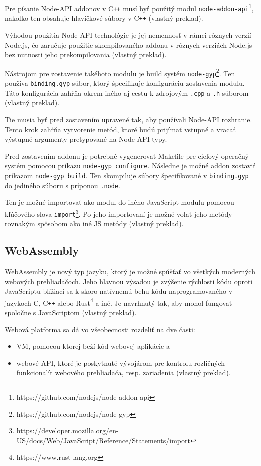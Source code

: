 Pre písanie Node-API addonov v C\texttt{++} musí byť použitý modul \texttt{node-addon-api}\footnote{https://github.com/nodejs/node-addon-api}, nakoľko ten obsahuje hlavičkové súbory v C\texttt{++} \cite{cpp_addons} (vlastný preklad).

Výhodou použitia Node-API technológie je jej nemennosť v rámci rôznych verzií Node.js, čo zaručuje použitie skompilovaného addonu v rôznych verziách Node.js bez nutnosti jeho prekompilovania \cite{cpp_addons} (vlastný preklad).

Nástrojom pre zostavenie takéhoto modulu je build systém \texttt{node-gyp}\footnote{https://github.com/nodejs/node-gyp}. Ten používa \texttt{binding.gyp} súbor, ktorý špecifikuje konfiguráciu zostavenia modulu. Táto konfigurácia zahŕňa okrem iného aj cestu k zdrojovým \texttt{.cpp} a \texttt{.h} súborom  \cite{cpp_addons} (vlastný preklad).

Tie musia byť pred zostavením upravené tak, aby používali Node-API rozhranie. Tento krok zahŕňa vytvorenie metód, ktoré budú prijímať vstupné a vracať výstupné argumenty pretypované na Node-API typy.

Pred zostavením addonu je potrebné vygenerovať Makefile pre cieľový operačný systém pomocou príkazu \texttt{node-gyp configure}. Následne je možné addon zostaviť príkazom \texttt{node-gyp build}. Ten skompiluje súbory špecifikované v \texttt{binding.gyp} do jediného súboru s príponou \texttt{.node}.

Ten je možné importovať ako modul do iného JavaScript modulu pomocou kľúčového slova \texttt{import}\footnote{https://developer.mozilla.org/en-US/docs/Web/JavaScript/Reference/Statements/import}. Po jeho importovaní je možné volať jeho metódy rovnakým spôsobom ako iné JS metódy \cite{cpp_addons} (vlastný preklad).

\subsection {WebAssembly}
WebAssembly je nový typ jazyku, ktorý je možné spúšťať vo všetkých moderných webových prehliadačoch. Jeho hlavnou výsadou je zvýšenie rýchlosti kódu oproti JavaScriptu blížiaci sa k skoro natívnemú behu kódu naprogramovaného v jazykoch C, C\texttt{++} alebo Rust\footnote{https://www.rust-lang.org} a iné. Je navrhnutý tak, aby mohol fungovať spoločne s JavaScriptom \cite{webassembly_concepts} (vlastný preklad).

Webová platforma sa dá vo všeobecnosti rozdeliť na dve časti:
\begin{itemize}
\item {VM, pomocou ktorej beží kód webovej aplikácie a}
\item {webové API, ktoré je poskytnuté vývojárom pre kontrolu rozličných funkcionalít webového prehliadača, resp. zariadenia  \cite{webassembly_concepts} (vlastný preklad).}
\end{itemize}

